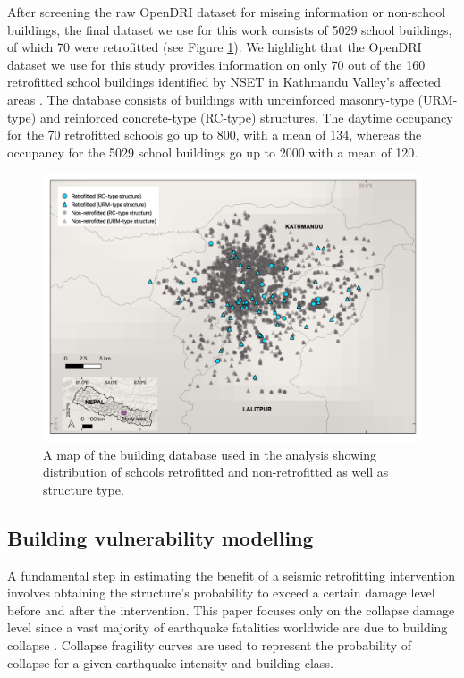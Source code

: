 After screening the raw OpenDRI dataset for missing information or non-school buildings, the final dataset we use for this work consists of 5029 school buildings, of which 70 were retrofitted (see Figure \ref{fig:data-all}). We highlight that the OpenDRI dataset we use for this study provides information on only 70 out of the 160 retrofitted school buildings identified by NSET in Kathmandu Valley's affected areas \citep{marasini_2019}. The database consists of buildings with unreinforced masonry-type (URM-type) and reinforced concrete-type (RC-type) structures. The daytime occupancy for the 70 retrofitted schools go up to 800, with a mean of 134, whereas the occupancy for the 5029 school buildings go up to 2000 with a mean of 120.

\begin{figure}[h!] 
\begin{center}
    \includegraphics[width=\linewidth]{Figures/Datasets-basic.png}
	\caption{A map of the building database used in the analysis showing distribution of schools retrofitted and non-retrofitted as well as structure type.}
	\label{fig:data-all}
\end{center}
\end{figure}


\subsection{Building vulnerability modelling}
\label{section-vuln}

A fundamental step in estimating the benefit of a seismic retrofitting intervention involves obtaining the structure’s probability to exceed a certain damage level before and after the intervention. This paper focuses only on the collapse damage level since a vast majority of earthquake fatalities worldwide are due to building collapse \citep{spence2007saving}. Collapse fragility curves are used to represent the probability of collapse for a given earthquake intensity and building class. 

